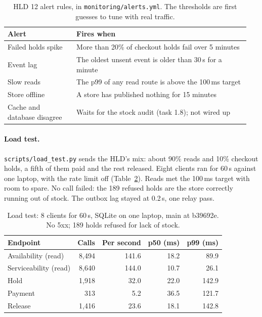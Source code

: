 \begin{table}[ht]
  \centering
  \footnotesize
  \begin{tabular}{@{}>{\raggedright\arraybackslash}p{0.27\linewidth}>{\raggedright\arraybackslash}p{0.68\linewidth}@{}}
    \toprule
    Alert & Fires when \\
    \midrule
    Failed holds spike & More than 20\% of checkout holds fail over 5 minutes \\
    Event lag & The oldest unsent event is older than 30\,s for a minute \\
    Slow reads & The p99 of any read route is above the 100\,ms target \\
    Store offline & A store has published nothing for 15 minutes \\
    Cache and database disagree & Waits for the stock audit (task 1.8); not wired up \\
    \bottomrule
  \end{tabular}
  \caption{HLD 12 alert rules, in \texttt{monitoring/alerts.yml}. The thresholds are first guesses to tune with real
    traffic.}
  \label{tab:alerts}
\end{table}

\paragraph{Load test.} \texttt{scripts/load\_test.py} sends the HLD's mix: about 90\% reads and 10\% checkout holds,
a fifth of them paid and the rest released. Eight clients ran for 60\,s against one laptop, with the rate limit off
(Table~\ref{tab:load}). Reads met the 100\,ms target with room to spare. No call failed: the 189 refused holds are
the store correctly running out of stock. The outbox lag stayed at 0.2\,s, one relay pass.

\begin{table}[ht]
  \centering
  \small
  \begin{tabular}{@{}lrrrr@{}}
    \toprule
    Endpoint & Calls & Per second & p50 (ms) & p99 (ms) \\
    \midrule
    Availability (read)   & 8{,}494 & 141.6 & 18.2 &  89.9 \\
    Serviceability (read) & 8{,}640 & 144.0 & 10.7 &  26.1 \\
    Hold                  & 1{,}918 &  32.0 & 22.0 & 142.9 \\
    Payment               &     313 &   5.2 & 36.5 & 121.7 \\
    Release               & 1{,}416 &  23.6 & 18.1 & 142.8 \\
    \bottomrule
  \end{tabular}
  \caption{Load test: 8 clients for 60\,s, SQLite on one laptop, main at b39692e. No 5xx; 189 holds refused for
    lack of stock.}
  \label{tab:load}
\end{table}

